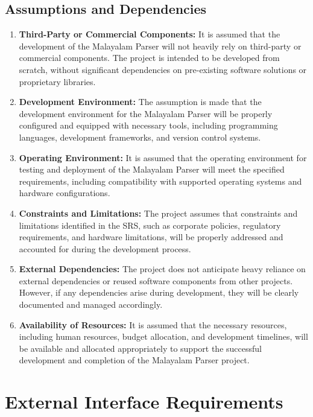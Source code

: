 \documentclass[12pt]{article}
\begin{document}
	\subsection{Assumptions and Dependencies}
	\begin{enumerate}
		\item \textbf{Third-Party or Commercial Components:} It is assumed that the development of
		the Malayalam Parser will not heavily rely on third-party or commercial components.
		The project is intended to be developed from scratch, without significant
		dependencies on pre-existing software solutions or proprietary libraries.
		\item \textbf{Development Environment:} The assumption is made that the development
		environment for the Malayalam Parser will be properly configured and equipped
		with necessary tools, including programming languages, development frameworks,
		and version control systems.
		\item \textbf{Operating Environment:} It is assumed that the operating environment for testing
		and deployment of the Malayalam Parser will meet the specified requirements,
		including
		compatibility
		with
		supported
		operating
		systems
		and
		hardware
		configurations.
		\item \textbf{Constraints and Limitations:} The project assumes that constraints and limitations
		identified in the SRS, such as corporate policies, regulatory requirements, and
		hardware limitations, will be properly addressed and accounted for during the
		development process.
		\item \textbf{External Dependencies:} The project does not anticipate heavy reliance on external
		dependencies or reused software components from other projects. However, if any
		dependencies arise during development, they will be clearly documented and
		managed accordingly.
		\item \textbf{Availability of Resources:} It is assumed that the necessary resources, including
		human resources, budget allocation, and development timelines, will be available
		and allocated appropriately to support the successful development and completion
		of the Malayalam Parser project.
	\end{enumerate}
	
	\section{External Interface Requirements}
	
\end{document}
